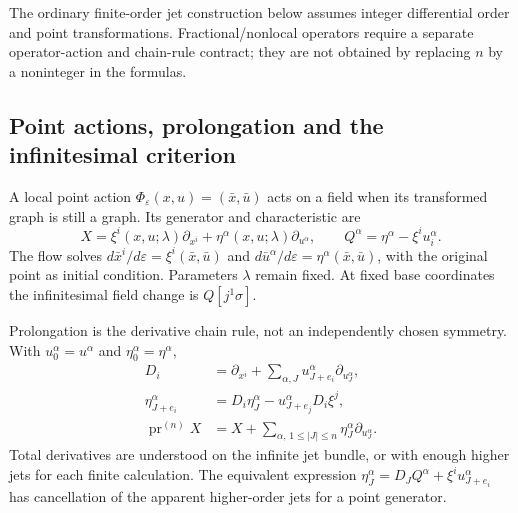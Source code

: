 \documentclass[11pt]{article}
\theoremstyle{definition}
\newcommand{\pr}{\operatorname{pr}}
\begin{document}
The ordinary finite-order jet construction below assumes integer differential
order and point transformations. Fractional/nonlocal operators require a
separate operator-action and chain-rule contract; they are not obtained by
replacing $n$ by a noninteger in the formulas.

\subsection{Point actions, prolongation and the infinitesimal criterion}
\label{sec:prolongation-core}
A local point action $\Phi_\varepsilon(x,u)=(\bar x,\bar u)$ acts on a field
when its transformed graph is still a graph. Its generator and characteristic are
\begin{equation}
 X=\xi^i(x,u;\lambda)\partial_{x^i}
       +\eta^\alpha(x,u;\lambda)\partial_{u^\alpha},\qquad
 Q^\alpha=\eta^\alpha-\xi^i u_i^\alpha.
 \label{eq:characteristic-core}
\end{equation}
The flow solves $d\bar x^i/d\varepsilon=\xi^i(\bar x,\bar u)$ and
$d\bar u^\alpha/d\varepsilon=\eta^\alpha(\bar x,\bar u)$, with the original
point as initial condition. Parameters $\lambda$ remain fixed. At fixed base
coordinates the infinitesimal field change is $Q[j^1\sigma]$.

Prolongation is the derivative chain rule, not an independently chosen symmetry.
With $u_0^\alpha=u^\alpha$ and $\eta_0^\alpha=\eta^\alpha$,
\begin{align}
 D_i&=\partial_{x^i}+\sum_{\alpha,J}u_{J+e_i}^\alpha\partial_{u_J^\alpha},\\
 \eta_{J+e_i}^\alpha&=D_i\eta_J^\alpha-u_{J+e_j}^\alpha D_i\xi^j,\\
 \pr^{(n)}X&=X+\sum_{\alpha,\,1\le |J|\le n}
                      \eta_J^\alpha\partial_{u_J^\alpha}.
 \label{eq:prolongation-core}
\end{align}
Total derivatives are understood on the infinite jet bundle, or with enough
higher jets for each finite calculation. The equivalent expression
$\eta_J^\alpha=D_JQ^\alpha+\xi^iu_{J+e_i}^\alpha$ has cancellation of the
apparent higher-order jets for a point generator.
\end{document}
